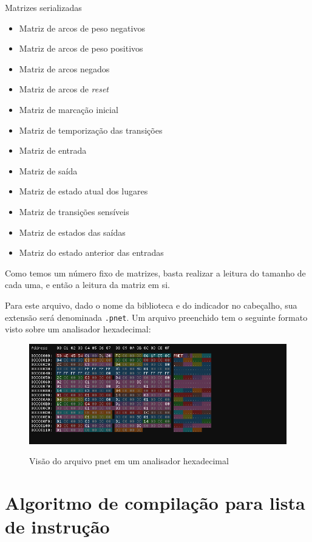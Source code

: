 Matrizes serializadas
\begin{itemize} 
	\item Matriz de arcos de peso negativos
	\item Matriz de arcos de peso positivos
	\item Matriz de arcos negados
	\item Matriz de arcos de \textit{reset}
	\item Matriz de marcação inicial
	\item Matriz de temporização das transições
	\item Matriz de entrada
	\item Matriz de saída
	\item Matriz de estado atual dos lugares
	\item Matriz de transições sensíveis
	\item Matriz de estados das saídas
	\item Matriz do estado anterior das entradas
\end{itemize}

Como temos um número fixo de matrizes, basta realizar a leitura do tamanho de cada uma, e então a leitura da matriz em si. 

Para este arquivo, dado o nome da biblioteca e do indicador no cabeçalho, sua extensão será denominada \lstinline{.pnet}. Um arquivo preenchido tem o seguinte formato visto sobre um analisador hexadecimal:

\begin{figure}[h!]
	\centering
	\caption{Visão do arquivo pnet em um analisador hexadecimal}
	\includegraphics[width=16cm]{images/hexfile.png}
	\label{fig:hexfile}
\end{figure}

\pagebreak

\section{Algoritmo de compilação para lista de instrução}

